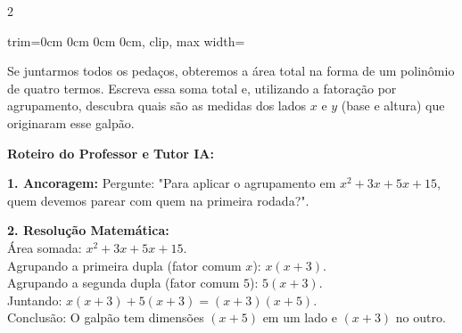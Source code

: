 \begin{multicols*}{2}
\begin{enunciadoLiteral}
\begin{center}
\begin{adjustbox}{trim=0cm 0cm 0cm 0cm, clip, max width=\larguraTikz}
\end{adjustbox}
\end{center}

Se juntarmos todos os pedaços, obteremos a área total na forma de um polinômio de quatro termos. Escreva essa soma total e, utilizando a fatoração por agrupamento, descubra quais são as medidas dos lados $x$ e $y$ (base e altura) que originaram esse galpão.
\end{enunciadoLiteral}

\ifgabarito
    \begin{tcolorbox}[colback=CorTitUm!5, colframe=CorTitUm, boxrule=1pt, arc=4pt, left=6pt, right=6pt, top=6pt, bottom=6pt]
    \small\textbf{\textcolor{CorTitUm}{Roteiro do Professor e Tutor IA:}}\par\vspace{0.1cm}
    \color{CinzaEscuro}
    \textbf{1. Ancoragem:} Pergunte: "Para aplicar o agrupamento em $x^2 + 3x + 5x + 15$, quem devemos parear com quem na primeira rodada?".\par\vspace{0.1cm}
    \textbf{2. Resolução Matemática:}\\
    Área somada: $x^2 + 3x + 5x + 15$.\\
    Agrupando a primeira dupla (fator comum $x$): $x(x + 3)$.\\
    Agrupando a segunda dupla (fator comum $5$): $5(x + 3)$.\\
    Juntando: $x(x + 3) + 5(x + 3) = (x + 3)(x + 5)$.\\
    Conclusão: O galpão tem dimensões $(x + 5)$ em um lado e $(x + 3)$ no outro.
    \end{tcolorbox}
    \vspace{0.15cm}
    

\end{multicols*}
